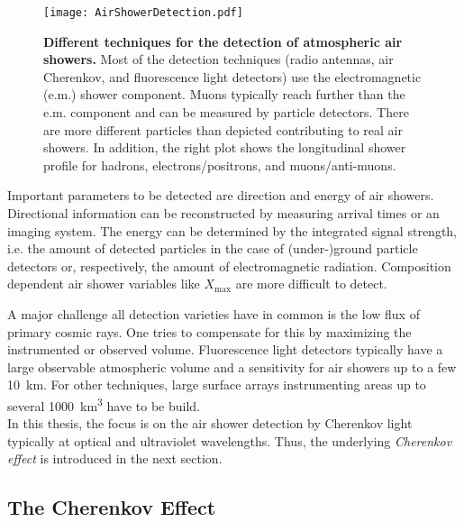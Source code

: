 \begin{figure}[h]
	\texttt{[image: AirShowerDetection.pdf]}
	\caption[Different techniques for air shower detection]{\textbf{Different techniques for the detection of atmospheric air showers.} \cite{airshowers:schroeder} Most of the detection techniques (radio antennas, air Cherenkov, and fluorescence light detectors) use the electromagnetic (e.m.) shower component. Muons typically reach further than the e.m. component and can be measured by particle detectors. There are more different particles than depicted contributing to real air showers. In addition, the right plot shows the longitudinal shower profile for hadrons, electrons/positrons, and muons/anti-muons.}	
	\label{intro:airshower_detection_sketch}
\end{figure}

Important parameters to be detected are direction and energy of air showers. Directional information can be reconstructed by measuring arrival times or an imaging system. The energy can be determined by the integrated signal strength, i.e. the amount of detected particles in the case of (under-)ground particle detectors or, respectively, the amount of electromagnetic radiation. Composition dependent air shower variables like $X_\text{max}$ are more difficult to detect.

A major challenge all detection varieties have in common is the low flux of primary cosmic rays. One tries to compensate for this by maximizing the instrumented or observed volume. Fluorescence light detectors typically have a large observable atmospheric volume and a sensitivity for air showers up to a few \SI{10}{\kilo\meter}. For other techniques, large surface arrays instrumenting areas up to several \SI{1000}{\cubic\kilo\meter} have to be build.~\cite{airshowers:schroeder}\\

In this thesis, the focus is on the air shower detection by Cherenkov light typically at optical and ultraviolet wavelengths. Thus, the underlying \textit{Cherenkov effect} is introduced in the next section.

\subsection{The Cherenkov Effect}\label{sec:intro:cherenkov}

